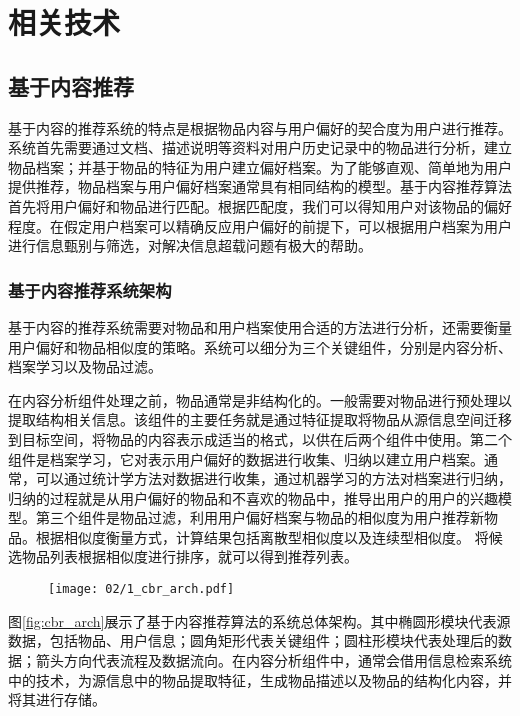 
\chapter{相关技术}
\label{chap:related}

\section{基于内容推荐}

基于内容的推荐系统的特点是根据物品内容与用户偏好的契合度为用户进行推荐\parencite{lops2011content}。系统首先需要通过文档、描述说明等资料对用户历史记录中的物品进行分析，建立物品档案；并基于物品的特征为用户建立偏好档案。为了能够直观、简单地为用户提供推荐，物品档案与用户偏好档案通常具有相同结构的模型。基于内容推荐算法首先将用户偏好和物品进行匹配。根据匹配度，我们可以得知用户对该物品的偏好程度。在假定用户档案可以精确反应用户偏好的前提下，可以根据用户档案为用户进行信息甄别与筛选，对解决信息超载问题有极大的帮助。

\subsection{基于内容推荐系统架构}
基于内容的推荐系统需要对物品和用户档案使用合适的方法进行分析，还需要衡量用户偏好和物品相似度的策略。系统可以细分为三个关键组件，分别是内容分析、档案学习以及物品过滤。

在内容分析组件处理之前，物品通常是非结构化的。一般需要对物品进行预处理以提取结构相关信息。该组件的主要任务就是通过特征提取将物品从源信息空间迁移到目标空间，将物品的内容表示成适当的格式，以供在后两个组件中使用。第二个组件是档案学习，它对表示用户偏好的数据进行收集、归纳以建立用户档案。通常，可以通过统计学方法对数据进行收集，通过机器学习的方法对档案进行归纳，归纳的过程就是从用户偏好的物品和不喜欢的物品中，推导出用户的用户的兴趣模型。第三个组件是物品过滤，利用用户偏好档案与物品的相似度\parencite{herlocker2004evaluating}为用户推荐新物品。根据相似度衡量方式，计算结果包括离散型相似度以及连续型相似度。
将候选物品列表根据相似度进行排序，就可以得到推荐列表。

\begin{figure}
 \centering
 \texttt{[image: 02/1\_cbr\_arch.pdf]}
\end{figure}

图\ref{fig:cbr_arch}展示了基于内容推荐算法的系统总体架构。其中椭圆形模块代表源数据，包括物品、用户信息；圆角矩形代表关键组件；圆柱形模块代表处理后的数据；箭头方向代表流程及数据流向。在内容分析组件中，通常会借用信息检索系统中的技术，为源信息中的物品提取特征，生成物品描述以及物品的结构化内容，并将其进行存储。

